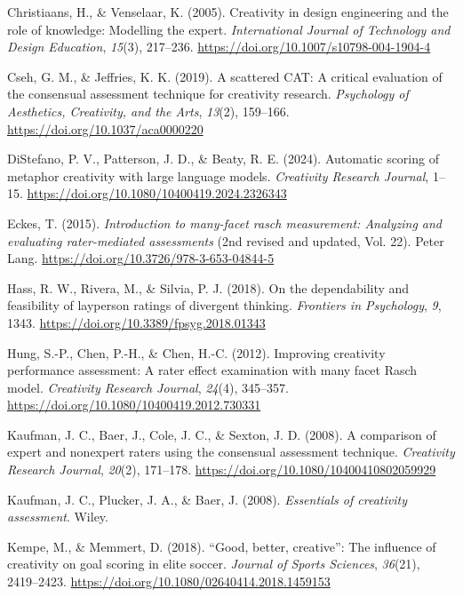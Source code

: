 \documentclass[
  12pt,
]{article}
\newlength{\cslhangindent}
\newenvironment{CSLReferences}[2] %
 {\begin{list}{}{%
  \setlength{\itemindent}{0pt}
  \setlength{\leftmargin}{0pt}
  \setlength{\parsep}{0pt}
  \ifodd #1
   \setlength{\leftmargin}{\cslhangindent}
   \setlength{\itemindent}{-1\cslhangindent}
  \fi
  \setlength{\itemsep}{#2\baselineskip}}}
 {\end{list}}
\begin{document}
\begin{CSLReferences}{1}{0}
Christiaans, H., \& Venselaar, K. (2005). Creativity in design
engineering and the role of knowledge: Modelling the expert.
\emph{International Journal of Technology and Design Education},
\emph{15}(3), 217--236. \url{https://doi.org/10.1007/s10798-004-1904-4}

Cseh, G. M., \& Jeffries, K. K. (2019). A scattered {CAT}: A critical
evaluation of the consensual assessment technique for creativity
research. \emph{Psychology of Aesthetics, Creativity, and the Arts},
\emph{13}(2), 159--166. \url{https://doi.org/10.1037/aca0000220}

DiStefano, P. V., Patterson, J. D., \& Beaty, R. E. (2024). Automatic
scoring of metaphor creativity with large language models.
\emph{Creativity Research Journal}, 1--15.
\url{https://doi.org/10.1080/10400419.2024.2326343}

Eckes, T. (2015). \emph{Introduction to many-facet rasch measurement:
Analyzing and evaluating rater-mediated assessments} (2nd revised and
updated, Vol. 22). Peter Lang.
\url{https://doi.org/10.3726/978-3-653-04844-5}

Hass, R. W., Rivera, M., \& Silvia, P. J. (2018). On the dependability
and feasibility of layperson ratings of divergent thinking.
\emph{Frontiers in Psychology}, \emph{9}, 1343.
\url{https://doi.org/10.3389/fpsyg.2018.01343}

Hung, S.-P., Chen, P.-H., \& Chen, H.-C. (2012). Improving creativity
performance assessment: A rater effect examination with many facet
{Rasch} model. \emph{Creativity Research Journal}, \emph{24}(4),
345--357. \url{https://doi.org/10.1080/10400419.2012.730331}

Kaufman, J. C., Baer, J., Cole, J. C., \& Sexton, J. D. (2008). A
comparison of expert and nonexpert raters using the consensual
assessment technique. \emph{Creativity Research Journal}, \emph{20}(2),
171--178. \url{https://doi.org/10.1080/10400410802059929}

Kaufman, J. C., Plucker, J. A., \& Baer, J. (2008). \emph{Essentials of
creativity assessment}. Wiley.

Kempe, M., \& Memmert, D. (2018). {``}Good, better, creative{''}: The
influence of creativity on goal scoring in elite soccer. \emph{Journal
of Sports Sciences}, \emph{36}(21), 2419--2423.
\url{https://doi.org/10.1080/02640414.2018.1459153}


\end{CSLReferences}
\end{document}
